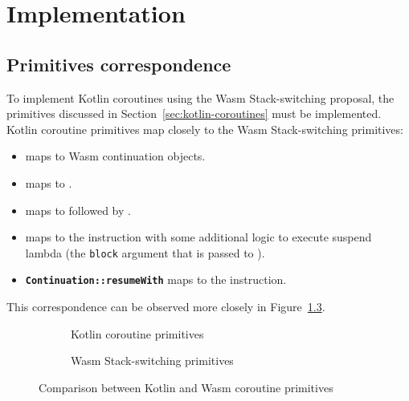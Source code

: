 \chapter{Implementation}
\label{ch:implementation}

\section{Primitives correspondence}

To implement Kotlin coroutines using the Wasm Stack-switching proposal, the primitives
discussed in Section~\ref{sec:kotlin-coroutines} must be implemented. Kotlin coroutine primitives map
closely to the Wasm Stack-switching primitives:
\begin{itemize}
    \item \textbf{\Continuation} maps to Wasm continuation objects.

    \item \textbf{\createCoroutineUnintercepted} maps to \contnew.

    \item \textbf{\startCoroutineUninterceptedOrReturn} maps to \contnew followed by \wasmresume.

    \item \textbf{\suspendCoroutineUninterceptedOrReturn} maps to the \wasmsuspend instruction with some additional
    logic to execute suspend lambda (the \texttt{block} argument that is passed to \suspendCoroutineUninterceptedOrReturn).
    \item \textbf{\texttt{Continuation::resumeWith}} maps to the \wasmresume instruction.
\end{itemize}

This correspondence can be observed more closely in Figure~\ref{fig:primitives-correspondence}.

\begin{figure}[H]
    \centering
    \begin{subfigure}{0.48\textwidth}
        \centering
        \resizebox{\textwidth}{!}{}
        \caption{Kotlin coroutine primitives}
        \label{subfig:kotlin-primitives}
    \end{subfigure}
    \hfill
    \begin{subfigure}{0.48\textwidth}
        \centering
        \resizebox{\textwidth}{!}{}
        \caption{Wasm Stack-switching primitives}
        \label{subfig:wasm-primitives}
    \end{subfigure}
    \caption{Comparison between Kotlin and Wasm coroutine primitives}
    \label{fig:primitives-correspondence}
\end{figure}

